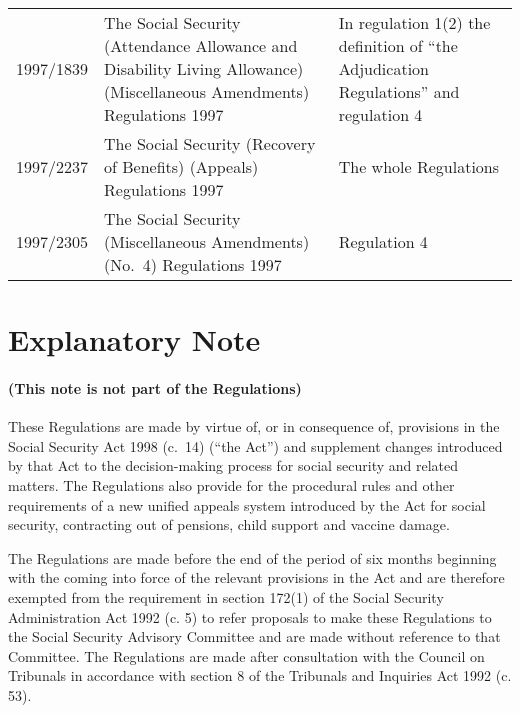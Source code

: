 \documentclass[12pt,a4paper]{article}
\begin{document}
{\begin{longtable}{p{50pt}p{188pt}p{116pt}}
1997/1839&The Social Security (Attendance Allowance and Disability Living Allowance) (Miscellaneous Amendments) Regulations 1997&In regulation 1(2) the definition of “the Adjudication Regulations” and regulation 4\\
1997/2237&The Social Security (Recovery of Benefits) (Appeals) Regulations 1997&The whole Regulations\\
1997/2305&The Social Security (Miscellaneous Amendments) (No.\ 4) Regulations 1997&Regulation 4\\
\end{longtable}

}


\part{Explanatory Note}

\renewcommand\parthead{--- Explanatory Note}

\subsection*{(This note is not part of the Regulations)}

 These Regulations are made by virtue of, or in consequence of, provisions in the Social Security Act 1998 (c.\ 14) (“the Act”) and supplement changes introduced by that Act to the decision-making process for social security and related matters. The Regulations also provide for the procedural rules and other requirements of a new unified appeals system introduced by the Act for social security, contracting out of pensions, child support and vaccine damage.

  The Regulations are made before the end of the period of six months beginning with the coming into force of the relevant provisions in the Act and are therefore exempted from the requirement in section 172(1) of the Social Security Administration Act 1992 (c. 5) to refer proposals to make these Regulations to the Social Security Advisory Committee and are made without reference to that Committee. The Regulations are made after consultation with the Council on Tribunals in accordance with section 8 of the Tribunals and Inquiries Act 1992 (c. 53).
\end{document}
